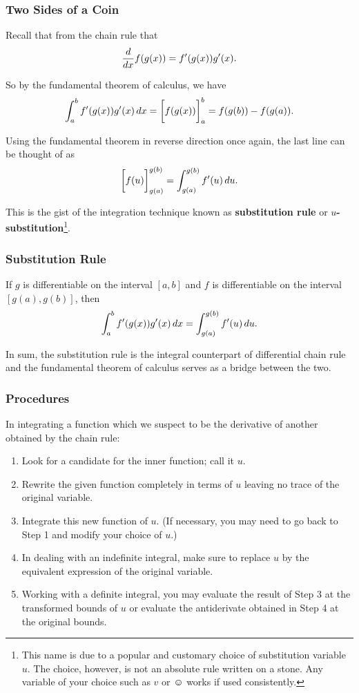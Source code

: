 \documentclass[10pt,t,handout,ignorenonframetext,aspectratio=169]{beamer}
\title[\course]{\lecTitle}
\institute[Ohio State]
{
  \medskip
}
\date[\week]{\semester}
\author{Tae Eun Kim, Ph.D.}
\begin{document}
\begin{frame}
  \titlepage
\end{frame}

\begin{frame}
  \frametitle{Two Sides of a Coin}
  \begingroup
  \small

  Recall that from the chain rule that
  \[
    \frac{d}{\mathop{}\!d x} f(g(x)) = f'(g(x)) g'(x).
  \]

  So by the fundamental theorem of calculus, we have
  \begin{equation*}
    \int_a^b f'(g(x))g'(x) \mathop{}\!d x
    = \bigg[ f(g(x)) \bigg]_a^b
    = f(g(b)) - f(g(a)).
  \end{equation*}

  Using the fundamental theorem in reverse direction once again, the
  last line can be thought of as
  \[
    \bigg[ f(u) \bigg]_{g(a)}^{g(b)} = \int_{g(a)}^{g(b)}f'(u) \mathop{}\!d u.
  \]

  This is the gist of the integration technique known as
  \textbf{substitution rule} or
  \textbf{$u$-substitution}\footnote{{\footnotesize This name is due to a popular and customary
    choice of substitution variable $u$. The choice, however, is not
    an absolute rule written on a stone. Any variable of your choice
    such as $v$ or $\smiley$ works if used consistently.}}.
  \endgroup
\end{frame}


\begin{frame}
  \frametitle{Substitution Rule}
  \begin{thm}
    If $g$ is differentiable on the interval $[a,b]$ and $f$ is
    differentiable on the interval $[g(a),g(b)]$, then
    \[
      \int_a^b f'(g(x)) g'(x) \mathop{}\!d x =\int_{g(a)}^{g(b)} f'(u) \mathop{}\!d u.
    \]
  \end{thm}
  In sum, the substitution rule is the integral counterpart of
  differential chain rule and the fundamental theorem of calculus
  serves as a bridge between the two.
\end{frame}

\begin{frame}
  \frametitle{Procedures}
  In integrating a function which we suspect to be the derivative of
  another obtained by the chain rule:
  \begin{enumerate}
  \item Look for a candidate for the inner function; call it $u$.
  \item Rewrite the given function completely in terms of $u$ leaving
    no trace of the original variable.
  \item Integrate this new function of $u$. (If necessary, you may
    need to go back to Step 1 and modify your choice of $u$.)
  \item In dealing with an indefinite integral, make sure to replace
    $u$ by the equivalent expression of the original variable.
  \item Working with a definite integral, you may evaluate the result
    of Step 3 at the transformed bounds of $u$ or evaluate the
    antiderivate obtained in Step 4 at the original bounds.
  \end{enumerate}
\end{frame}
\end{document}
